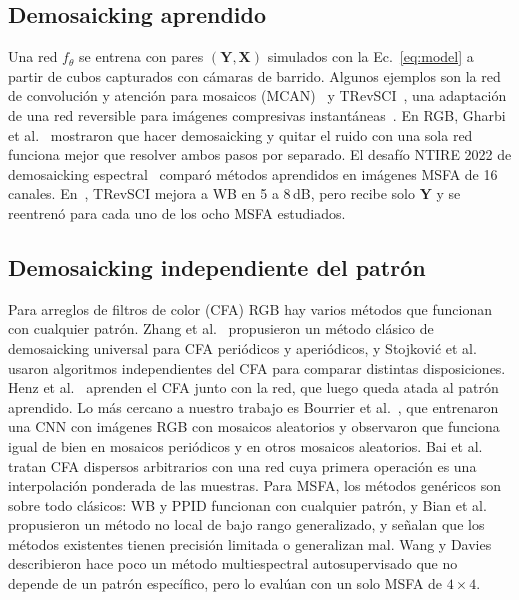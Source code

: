 \documentclass{article}
\def\X{{\mathbf X}}
\def\Y{{\mathbf Y}}
\begin{document}
\subsection{Demosaicking aprendido}

Una red $f_\theta$ se entrena con pares $(\Y,\X)$ simulados con la
Ec.~\eqref{eq:model} a partir de cubos capturados con cámaras de barrido.
Algunos ejemplos son la red de convolución y atención para mosaicos
(MCAN)~\cite{feng2021} y TRevSCI~\cite{diaz2023}, una adaptación de una red
reversible para imágenes compresivas instantáneas~\cite{cheng2021}. En RGB,
Gharbi et al.~\cite{gharbi2016} mostraron que hacer demosaicking y quitar el
ruido con una sola red funciona mejor que resolver ambos pasos por separado.
El desafío NTIRE 2022 de demosaicking espectral~\cite{arad2022demosaic}
comparó métodos aprendidos en imágenes MSFA de 16 canales.
En~\cite{diaz2023}, TRevSCI mejora a WB en 5 a 8\,dB, pero recibe solo $\Y$
y se reentrenó para cada uno de los ocho MSFA estudiados.

\subsection{Demosaicking independiente del patrón}

Para arreglos de filtros de color (CFA) RGB hay varios métodos que funcionan
con cualquier patrón. Zhang et al.~\cite{zhang2016} propusieron un método
clásico de demosaicking universal para CFA periódicos y aperiódicos, y
Stojkovi\'c et al.~\cite{stojkovic2019} usaron algoritmos independientes del
CFA para comparar distintas disposiciones. Henz et al.~\cite{henz2018}
aprenden el CFA junto con la red, que luego queda atada al patrón aprendido.
Lo más cercano a nuestro trabajo es Bourrier et al.~\cite{bourrier2022}, que
entrenaron una CNN con imágenes RGB con mosaicos aleatorios y observaron que
funciona igual de bien en mosaicos periódicos y en otros mosaicos
aleatorios. Bai et al.~\cite{bai2024} tratan CFA dispersos arbitrarios con
una red cuya primera operación es una interpolación ponderada de las
muestras. Para MSFA, los métodos genéricos son sobre todo clásicos: WB y
PPID funcionan con cualquier patrón, y Bian et al.~\cite{bian2021}
propusieron un método no local de bajo rango generalizado, y señalan que los
métodos existentes tienen precisión limitada o generalizan mal. Wang y
Davies~\cite{wang2026} describieron hace poco un método multiespectral
autosupervisado que no depende de un patrón específico, pero lo evalúan con
un solo MSFA de $4\times4$.
\end{document}
